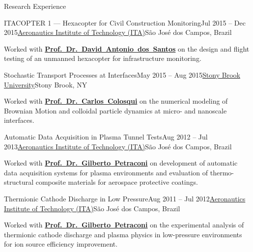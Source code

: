 \documentclass{resume} %
\begin{document}
\begin{rSection}{Research Experience}
\begin{rSubsection}{ITACOPTER 1 --- Hexacopter for Civil Construction Monitoring}{Jul 2015 -- Dec 2015}{\href{http://www.ita.br/}{Aeronautics Institute of Technology (ITA)}}{São José dos Campos, Brazil}
\item Worked with \href{https://scholar.google.com.br/citations?user=K7tHSrYAAAAJ&hl=BR}{\textbf{Prof.~Dr.~David~Antonio~dos~Santos}} on the design and flight testing of an unmanned hexacopter for infrastructure monitoring.
\end{rSubsection}

\begin{rSubsection}{Stochastic Transport Processes at Interfaces}{May 2015 -- Aug 2015}{\href{https://www.stonybrook.edu/}{Stony Brook University}}{Stony Brook, NY}
\item Worked with {\href{https://me.stonybrook.edu/people/faculty/Colosqui_Carlos.html}{\textbf{Prof.~Dr.~Carlos~Colosqui}}} on the numerical modeling of Brownian Motion and colloidal particle dynamics at micro- and nanoscale interfaces.
\end{rSubsection}

\begin{rSubsection}{Automatic Data Acquisition in Plasma Tunnel Tests}{Aug 2012 -- Jul 2013}{\href{http://www.ita.br/}{Aeronautics Institute of Technology (ITA)}}{São José dos Campos, Brazil}
\item Worked with \href{https://scholar.google.com.br/citations?user=gu-xROMAAAAJ&hl=pt-BR}{\textbf{Prof.~Dr.~Gilberto~Petraconi}} on development of automatic data acquisition systems for plasma environments and evaluation of thermo-structural composite materials for aerospace protective coatings.
\end{rSubsection}

\begin{rSubsection}{Thermionic Cathode Discharge in Low Pressure}{Aug 2011 -- Jul 2012}{\href{http://www.ita.br/}{Aeronautics Institute of Technology (ITA)}}{São José dos Campos, Brazil}
\item Worked with \href{https://scholar.google.com.br/citations?user=gu-xROMAAAAJ&hl=pt-BR}{\textbf{Prof.~Dr.~Gilberto~Petraconi}} on the experimental analysis of thermionic cathode discharge and plasma physics in low-pressure environments for ion source efficiency improvement.
\end{rSubsection}


\end{rSection}
\end{document}
